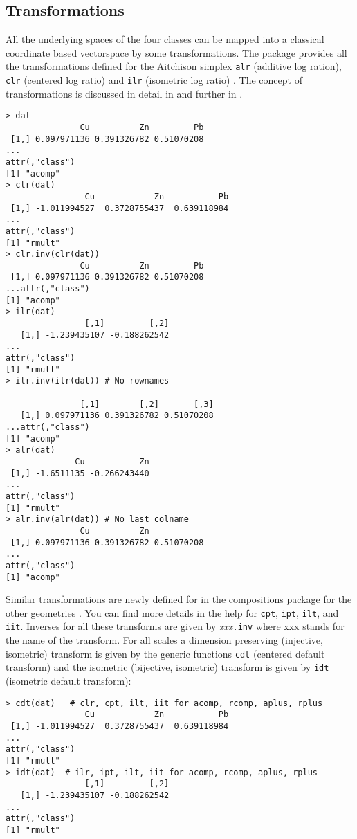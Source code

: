 \documentclass{article}
\newcommand{\code}[1]{{\tt #1}}
\begin{document}
\subsection{Transformations}
All the underlying spaces of the four classes can be mapped into a classical
coordinate based vectorspace by some transformations. The package provides all
the transformations defined for the Aitchison simplex \code{alr} (additive log
ration)\cite{Ait86}, \code{clr} (centered log ratio)\cite{Ait86} and
\code{ilr} (isometric log ratio) \cite{EPMB03}.  The concept of
transformations is discussed in detail in \cite{Paw03} and further in
\cite{PM05}.  
\begin{verbatim}
> dat
               Cu          Zn         Pb
 [1,] 0.097971136 0.391326782 0.51070208
...
attr(,"class")
[1] "acomp"
> clr(dat)
                Cu            Zn           Pb
 [1,] -1.011994527  0.3728755437  0.639118984
...
attr(,"class")
[1] "rmult"
> clr.inv(clr(dat))
               Cu          Zn         Pb
 [1,] 0.097971136 0.391326782 0.51070208
...attr(,"class")
[1] "acomp"
> ilr(dat)
                [,1]         [,2]
   [1,] -1.239435107 -0.188262542
...
attr(,"class")
[1] "rmult"
> ilr.inv(ilr(dat)) # No rownames 
       
               [,1]        [,2]       [,3]
   [1,] 0.097971136 0.391326782 0.51070208
...attr(,"class")
[1] "acomp"
> alr(dat)
              Cu           Zn
 [1,] -1.6511135 -0.266243440
...
attr(,"class")
[1] "rmult"
> alr.inv(alr(dat)) # No last colname
               Cu          Zn           
 [1,] 0.097971136 0.391326782 0.51070208
...
attr(,"class")
[1] "acomp"
\end{verbatim}
Similar transformations are newly defined for in the compositions package for
the other geometries . You can find more details in the help for \code{cpt},
\code{ipt}, \code{ilt}, and \code{iit}. Inverses for all these transforms are
given by {\em xxx}\code{.inv} where xxx stands for the name of the transform.
For all scales a dimension preserving (injective, isometric) transform is
given by the generic functions \code{cdt} (centered default transform) and the
isometric (bijective, isometric) transform is given by \code{idt} (isometric
default transform):
\begin{verbatim}
> cdt(dat)   # clr, cpt, ilt, iit for acomp, rcomp, aplus, rplus
                Cu            Zn           Pb
 [1,] -1.011994527  0.3728755437  0.639118984
...
attr(,"class")
[1] "rmult"
> idt(dat)  # ilr, ipt, ilt, iit for acomp, rcomp, aplus, rplus
                [,1]         [,2]
   [1,] -1.239435107 -0.188262542
...
attr(,"class")
[1] "rmult"
\end{verbatim}
\end{document}
